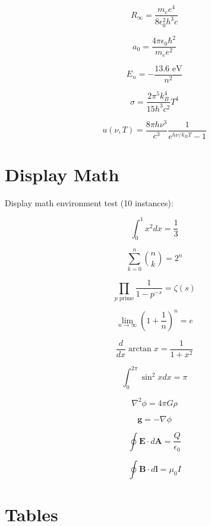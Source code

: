 \documentclass{article}
\begin{document}
\begin{equation}\label{eq:046}
R_\infty = \frac{m_e e^4}{8\epsilon_0^2 h^3 c}
\end{equation}

\begin{equation}\label{eq:047}
a_0 = \frac{4\pi\epsilon_0\hbar^2}{m_e e^2}
\end{equation}

\begin{equation}\label{eq:048}
E_n = -\frac{13.6\text{ eV}}{n^2}
\end{equation}

\begin{equation}\label{eq:049}
\sigma = \frac{2\pi^5 k_B^4}{15h^3c^2}T^4
\end{equation}

\begin{equation}\label{eq:050}
u(\nu, T) = \frac{8\pi h\nu^3}{c^3}\frac{1}{e^{h\nu/k_BT}-1}
\end{equation}

\section{Display Math}\label{sec:displaymath}

Display math environment test (10 instances):

\[
\displaystyle \int_0^1 x^2 dx = \frac{1}{3}
\]

\[
\displaystyle \sum_{k=0}^n \binom{n}{k} = 2^n
\]

\[
\displaystyle \prod_{p \text{ prime}} \frac{1}{1-p^{-s}} = \zeta(s)
\]

\[
\displaystyle \lim_{n\to\infty} \left(1+\frac{1}{n}\right)^n = e
\]

\[
\displaystyle \frac{d}{dx}\arctan x = \frac{1}{1+x^2}
\]

\[
\displaystyle \int_0^{2\pi} \sin^2 x dx = \pi
\]

\[
\displaystyle \nabla^2 \phi = 4\pi G\rho
\]

\[
\displaystyle \mathbf{g} = -\nabla\phi
\]

\[
\displaystyle \oint \mathbf{E} \cdot d\mathbf{A} = \frac{Q}{\epsilon_0}
\]

\[
\displaystyle \oint \mathbf{B} \cdot d\mathbf{l} = \mu_0 I
\]

\section{Tables}\label{sec:tables}
\end{document}
